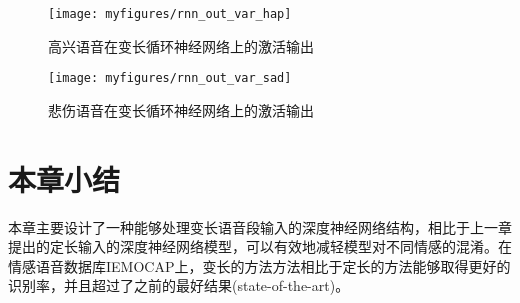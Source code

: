 \begin{figure}[h] %
    \vspace{-0.8cm}  %
    \setlength{\belowcaptionskip}{0cm}   %
    \centering
    \texttt{[image: myfigures/rnn\_out\_var\_hap]}
    \caption{高兴语音在变长循环神经网络上的激活输出}
    \label{fig:rnn_out_hap}
\end{figure}

\begin{figure}[!tp] %
    \vspace{-0cm}  %
    \setlength{\belowcaptionskip}{0cm}   %
    \centering
    \texttt{[image: myfigures/rnn\_out\_var\_sad]}
    \caption{悲伤语音在变长循环神经网络上的激活输出}
    \label{fig:rnn_out_sad}
\end{figure}


\section{本章小结}
\label{sec:var_len_summary}

本章主要设计了一种能够处理变长语音段输入的深度神经网络结构，相比于上一章提出的定长输入的深度神经网络模型，可以有效地减轻模型对不同情感的混淆。在情感语音数据库IEMOCAP上，变长的方法方法相比于定长的方法能够取得更好的识别率，并且超过了之前的最好结果(state-of-the-art)。